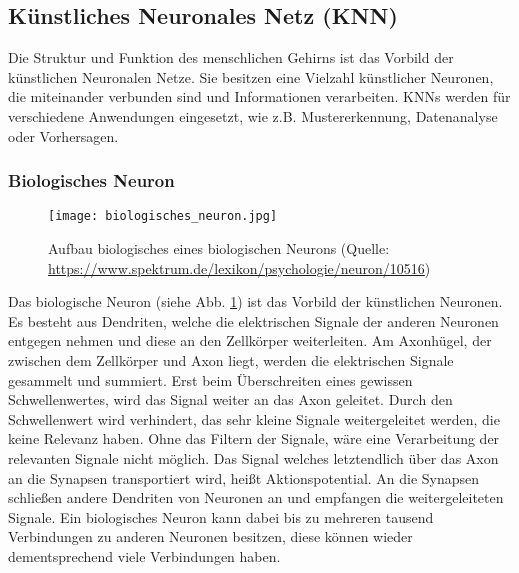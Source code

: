 \subsection{Künstliches Neuronales Netz (\acs{KNN})}
Die Struktur und Funktion des menschlichen Gehirns ist das Vorbild der künstlichen Neuronalen Netze. Sie besitzen eine Vielzahl künstlicher Neuronen, die miteinander verbunden sind und Informationen verarbeiten. \acs{KNN}s werden für verschiedene Anwendungen eingesetzt, wie z.B. Mustererkennung, Datenanalyse oder Vorhersagen.

\subsubsection{Biologisches Neuron}

\begin{figure}[h]
	\centering
	\texttt{[image: biologisches\_neuron.jpg]}
	\caption{Aufbau biologisches eines biologischen Neurons (Quelle: \url{https://www.spektrum.de/lexikon/psychologie/neuron/10516})}		\label{fig:BioNeuron}
\end{figure}

Das biologische Neuron (siehe Abb. \ref{fig:BioNeuron}) ist das Vorbild der künstlichen Neuronen. Es besteht aus Dendriten, welche die elektrischen Signale der anderen Neuronen entgegen nehmen und diese an den Zellkörper weiterleiten. 
Am Axonhügel, der zwischen dem Zellkörper und Axon liegt, werden die elektrischen Signale gesammelt und summiert. Erst beim Überschreiten eines gewissen Schwellenwertes, wird das Signal weiter an das Axon geleitet. Durch den Schwellenwert wird verhindert, das sehr kleine Signale weitergeleitet werden, die keine Relevanz haben. Ohne das Filtern der Signale, wäre eine Verarbeitung der relevanten Signale nicht möglich. Das Signal welches letztendlich über das Axon an die Synapsen transportiert wird, heißt Aktionspotential. An die Synapsen schließen andere Dendriten von Neuronen an und empfangen die weitergeleiteten Signale. Ein biologisches Neuron kann dabei bis zu mehreren tausend Verbindungen zu anderen Neuronen besitzen, diese können wieder dementsprechend viele Verbindungen haben.\cite[vgl.][]{Posthoff2022,JuergenCleve2020}

